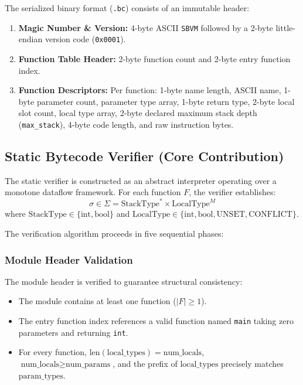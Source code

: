 \documentclass[conference]{IEEEtran}
\begin{document}
The serialized binary format (\texttt{.bc}) consists of an immutable header:
\begin{enumerate}
    \item \textbf{Magic Number \& Version:} 4-byte ASCII \texttt{SBVM} followed by a 2-byte little-endian version code (\texttt{0x0001}).
    \item \textbf{Function Table Header:} 2-byte function count and 2-byte entry function index.
    \item \textbf{Function Descriptors:} Per function: 1-byte name length, ASCII name, 1-byte parameter count, parameter type array, 1-byte return type, 2-byte local slot count, local type array, 2-byte declared maximum stack depth (\texttt{max\_stack}), 4-byte code length, and raw instruction bytes.
\end{enumerate}

\subsection{Static Bytecode Verifier (Core Contribution)}
The static verifier is constructed as an abstract interpreter operating over a monotone dataflow framework. For each function $F$, the verifier establishes:
\begin{equation}
\sigma \in \Sigma = \text{StackType}^* \times \text{LocalType}^M
\end{equation}
where $\text{StackType} \in \{\text{int}, \text{bool}\}$ and $\text{LocalType} \in \{\text{int}, \text{bool}, \text{UNSET}, \text{CONFLICT}\}$.

The verification algorithm proceeds in five sequential phases:

\subsubsection{Module Header Validation}
The module header is verified to guarantee structural consistency:
\begin{itemize}
    \item The module contains at least one function ($|F| \ge 1$).
    \item The entry function index references a valid function named \texttt{main} taking zero parameters and returning \texttt{int}.
    \item For every function, $\text{len}(\text{local\_types}) = \text{num\_locals}$, $\text{num\_locals} \ge \text{num\_params}$, and the prefix of $\text{local\_types}$ precisely matches $\text{param\_types}$.
\end{itemize}
\end{document}
